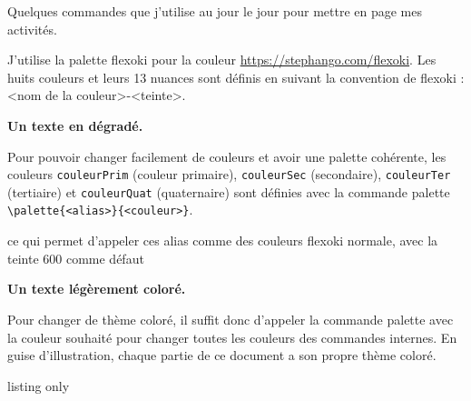 \documentclass[12pt]{extarticle}
\begin{document}
\begin{center}
  Quelques commandes que j'utilise au jour le jour pour mettre en page mes activités.
\end{center}

\tableofcontents
\newpage




J'utilise la palette flexoki pour la couleur \url{https://stephango.com/flexoki}. 
Les huits couleurs et leurs 13 nuances sont définis en suivant la convention de flexoki : <nom de la couleur>-<teinte>.
\begin{boiteCodeTex}{}
  \bfseries \textcolor{blue-200}{Un}
  \textcolor{blue-400}{texte}
  \textcolor{blue-600}{en}
  \textcolor{blue-800}{dégradé}.
\end{boiteCodeTex}



Pour pouvoir changer facilement de couleurs et avoir une palette cohérente, les couleurs \lstinline|couleurPrim| (couleur primaire), \lstinline|couleurSec| (secondaire), \lstinline|couleurTer| (tertiaire) et \lstinline|couleurQuat| (quaternaire) sont définies avec la commande palette \lstinline|\palette{<alias>}{<couleur>}|.

ce qui permet d'appeler ces alias comme des couleurs flexoki normale, avec la teinte 600 comme défaut
\begin{boiteCodeTex}{}
  \bfseries \textcolor{couleurPrim}{Un}
  \textcolor{couleurSec-700}{texte}
  \textcolor{couleurTer}{légèrement}
  \textcolor{couleurQuat}{coloré}.
\end{boiteCodeTex}

Pour changer de thème coloré, il suffit donc d'appeler la commande palette avec la couleur souhaité pour changer toutes les couleurs des commandes internes.
En guise d'illustration, chaque partie de ce document a son propre thème coloré.

\begin{boiteCodeTex}{listing only}
\end{boiteCodeTex}
\end{document}
